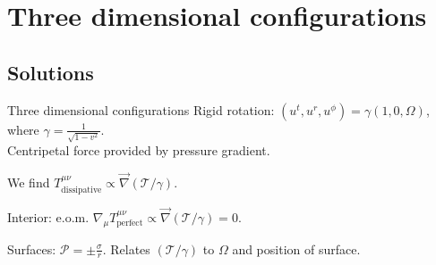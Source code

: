 \documentclass{beamer}
\newcommand{\tloc}{\mathcal{T}}
\newcommand{\ploc}{\mathcal{P}}
\begin{document}
%
%


\section{Three dimensional configurations}
\subsection{Solutions}

\begin{frame}{Three dimensional configurations}
%
 Rigid rotation: $(u^t,u^r,u^\phi)=\gamma(1,0,\Omega)$, where $\gamma=\frac{1}{\sqrt{1-v^2}}$.\\ Centripetal force provided by pressure gradient.

 \vp We find $T^{\mu\nu}_\mathrm{dissipative} \propto \vec{\nabla}(\tloc/\gamma)$.

 \vp Interior: e.o.m. $\nabla_\mu T^{\mu\nu}_\mathrm{perfect} \propto \vec{\nabla}(\tloc/\gamma)=0$.

 \vp Surfaces: $\ploc = \pm\frac{\sigma}{r}$. Relates $(\tloc/\gamma)$ to $\Omega$ and position of surface.
%
\end{frame}
\end{document}

